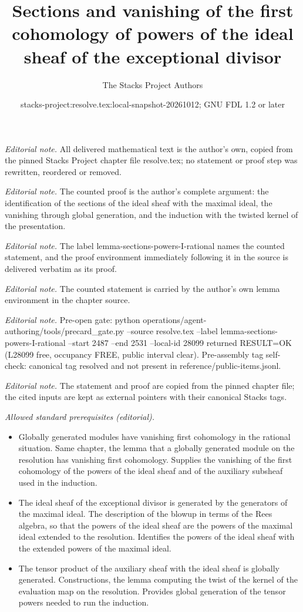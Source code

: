 \documentclass[10pt,a4paper]{amsart}
\title{Sections and vanishing of the first cohomology of powers of the ideal sheaf of the exceptional divisor}
\author{The Stacks Project Authors}
\date{stacks-project:resolve.tex:local-snapshot-20261012; GNU FDL 1.2 or later}
\theoremstyle{plain}
\theoremstyle{definition}
\theoremstyle{remark}
\numberwithin{equation}{subsection}
\begin{document}
\maketitle
\noindent\textit{Editorial note.} All delivered mathematical text is the author's own, copied from the pinned Stacks Project chapter file resolve.tex; no statement or proof step was rewritten, reordered or removed.\par\medskip
\noindent\textit{Editorial note.} The counted proof is the author's complete argument: the identification of the sections of the ideal sheaf with the maximal ideal, the vanishing through global generation, and the induction with the twisted kernel of the presentation.\par\medskip
\noindent\textit{Editorial note.} The label lemma-sections-powers-I-rational names the counted statement, and the proof environment immediately following it in the source is delivered verbatim as its proof.\par\medskip
\noindent\textit{Editorial note.} The counted statement is carried by the author's own lemma environment in the chapter source.\par\medskip
\noindent\textit{Editorial note.} Pre-open gate: python operations/agent-authoring/tools/precard\_gate.py --source resolve.tex --label lemma-sections-powers-I-rational --start 2487 --end 2531 --local-id 28099 returned RESULT=OK (L28099 free, occupancy FREE, public interval clear). Pre-assembly tag self-check: canonical tag resolved and not present in reference/public-items.jsonl.\par\medskip
\noindent\textit{Editorial note.} The statement and proof are copied from the pinned chapter file; the cited inputs are kept as external pointers with their canonical Stacks tags.\par\medskip
\noindent\textit{Allowed standard prerequisites (editorial).}\begin{itemize}
\item Globally generated modules have vanishing first cohomology in the rational situation. Same chapter, the lemma that a globally generated module on the resolution has vanishing first cohomology. Supplies the vanishing of the first cohomology of the powers of the ideal sheaf and of the auxiliary subsheaf used in the induction.
\item The ideal sheaf of the exceptional divisor is generated by the generators of the maximal ideal. The description of the blowup in terms of the Rees algebra, so that the powers of the ideal sheaf are the powers of the maximal ideal extended to the resolution. Identifies the powers of the ideal sheaf with the extended powers of the maximal ideal.
\item The tensor product of the auxiliary sheaf with the ideal sheaf is globally generated. Constructions, the lemma computing the twist of the kernel of the evaluation map on the resolution. Provides global generation of the tensor powers needed to run the induction.
\end{itemize}\medskip
\end{document}
